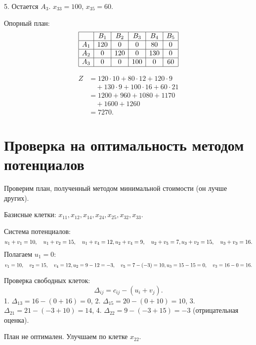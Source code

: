 \documentclass{article}
\begin{document}
5. Остается \( A_3 \).  
   \( x_{33} = 100 \), \( x_{35} = 60 \).  

Опорный план:  
\[
\begin{array}{|c|c|c|c|c|c|}
\hline
 & B_1 & B_2 & B_3 & B_4 & B_5 \\
\hline
A_1 & 120 & 0 & 0 & 80 & 0 \\
\hline
A_2 & 0 & 120 & 0 & 130 & 0 \\
\hline
A_3 & 0 & 0 & 100 & 0 & 60 \\
\hline
\end{array}
\]

\begin{align}
Z &= 120 \cdot 10 + 80 \cdot 12 + 120 \cdot 9 \nonumber \\
   &\quad + 130 \cdot 9 + 100 \cdot 16 + 60 \cdot 21 \nonumber \\
   &= 1200 + 960 + 1080 + 1170 \nonumber \\
   &\quad + 1600 + 1260 \nonumber \\
   &= 7270.
\end{align}

\section{Проверка на оптимальность методом потенциалов}

Проверим план, полученный методом минимальной стоимости (он лучше других).  

Базисные клетки:  
\( x_{11}, x_{12}, x_{14}, x_{24}, x_{25}, x_{32}, x_{33} \).  

Система потенциалов:  
\[
u_1 + v_1 = 10, \quad u_1 + v_2 = 15, \quad u_1 + v_4 = 12, \\
u_2 + v_4 = 9, \quad u_2 + v_5 = 7, \\
u_3 + v_2 = 15, \quad u_3 + v_3 = 16.
\]  
Полагаем \( u_1 = 0 \):  
\[
v_1 = 10, \quad v_2 = 15, \quad v_4 = 12, \\
u_2 = 9 - 12 = -3, \quad v_5 = 7 - (-3) = 10, \\
u_3 = 15 - 15 = 0, \quad v_3 = 16 - 0 = 16.
\]  

Проверка свободных клеток:  
\[
\Delta_{ij} = c_{ij} - (u_i + v_j).
\]  
1. \( \Delta_{13} = 16 - (0 + 16) = 0 \),  
2. \( \Delta_{15} = 20 - (0 + 10) = 10 \),  
3. \( \Delta_{21} = 21 - (-3 + 10) = 14 \),  
4. \( \Delta_{22} = 9 - (-3 + 15) = -3 \) (отрицательная оценка).  

План не оптимален. Улучшаем по клетке \( x_{22} \).  
\end{document}
